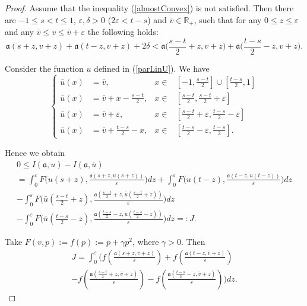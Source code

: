 \documentclass[12pt]{article}
\newcommand{\Real}{\mathbb R}
\newcommand{\eps}{\varepsilon}
\renewcommand{\le}{\leqslant}
\begin{document}
\begin{proof}
Assume that the inequality (\ref{almostConvex}) is not satisfied.
Then there are $-1 \le s < t \le 1$, $\eps, \delta > 0$ ($2 \eps < t - s$) and $\bar{v} \in \Real_+$,
such that for any $0 \le z \le \eps$ and any $\bar{v} \le v \le \bar{v} + \eps$ the following holds:
\begin{equation}
\label{notConvex}
\mathfrak a(s + z, v + z) + \mathfrak a(t - z, v + z) + 2 \delta < \mathfrak a\Big(\frac{s - t}{2} + z, v + z \Big) + \mathfrak a\Big(\frac{t - s}{2} - z, v + z \Big).
\end{equation}

Consider the function $u$ defined in (\ref{parLinU}). We have
$$
\left\{
\begin{aligned}
\bar{u}(x) &= \bar{v}, & x \in &[-1, \frac{s - t}{2}] \cup [\frac{t - s}{2}, 1]\\
\bar{u}(x) &= \bar{v} + x - \frac{s - t}{2}, & x \in &[\frac{s - t}{2}, \frac{s - t}{2} + \eps]\\
\bar{u}(x) &= \bar{v} + \eps, & x \in &[\frac{s - t}{2} + \eps, \frac{t - s}{2} - \eps]\\
\bar{u}(x) &= \bar{v} + \frac{t - s}{2} - x, & x \in &[\frac{t - s}{2} - \eps, \frac{t - s}{2}].
\end{aligned}
\right.
$$

Hence we obtain
\begin{multline*}
0 \le I(\mathfrak a, u) - I(\mathfrak a, \overline{u}) \\
=\int_0^{\eps} F\big( u(s + z), \frac{\mathfrak a( s + z, u(s + z) )}{\eps} \big) dz + \int_0^{\eps} F\big( u(t - z), \frac{\mathfrak a(t - z, u(t - z))}{\eps} \big) dz \\
-\int_0^{\eps} F\big( \bar{u}(\frac{s - t}{2} + z), \frac{\mathfrak a( \frac{s - t}{2} + z, \bar{u}(\frac{s - t}{2} + z) )}{\eps} \big) dz \\
-\int_0^{\eps} F\big( \bar{u}(\frac{t - s}{2} - z), \frac{\mathfrak a( \frac{t - s}{2} - z, \bar{u}(\frac{t - s}{2} - z) )}{\eps} \big) dz =: J.
\end{multline*}

Take $F(v, p) := f(p) := p + \gamma p^2$, where $\gamma > 0$.
Then
\begin{multline*}
J = \int_0^{\eps} \big( f(\frac{\mathfrak a(s + z, \bar{v} + z)}{\eps}) + f(\frac{\mathfrak a(t - z, \bar{v} + z)}{\eps}) \\
- f(\frac{\mathfrak a(\frac{s - t}{2} + z, \bar{v} + z)}{\eps}) - f(\frac{\mathfrak a(\frac{t - s}{2} - z, \bar{v} + z)}{\eps}) \big) dz.
\end{multline*}


\end{proof}
\end{document}
